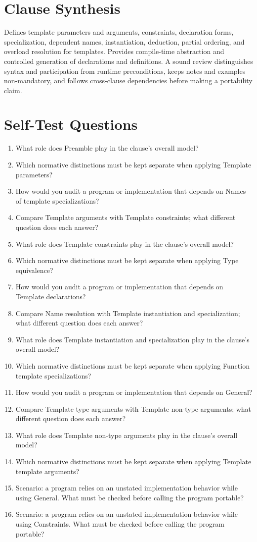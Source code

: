 \documentclass[11pt,letterpaper]{article}
\begin{document}
\section{Clause Synthesis}
\begin{CornellReferenceOrientationBox}Defines template parameters and arguments, constraints, declaration forms, specialization, dependent names, instantiation, deduction, partial ordering, and overload resolution for templates. Provides compile-time abstraction and controlled generation of declarations and definitions. A sound review distinguishes syntax and participation from runtime preconditions, keeps notes and examples non-mandatory, and follows cross-clause dependencies before making a portability claim.\end{CornellReferenceOrientationBox}
\section{Self-Test Questions}
\begin{enumerate}
\item What role does Preamble play in the clause's overall model?
\item Which normative distinctions must be kept separate when applying Template parameters?
\item How would you audit a program or implementation that depends on Names of template specializations?
\item Compare Template arguments with Template constraints; what different question does each answer?
\item What role does Template constraints play in the clause's overall model?
\item Which normative distinctions must be kept separate when applying Type equivalence?
\item How would you audit a program or implementation that depends on Template declarations?
\item Compare Name resolution with Template instantiation and specialization; what different question does each answer?
\item What role does Template instantiation and specialization play in the clause's overall model?
\item Which normative distinctions must be kept separate when applying Function template specializations?
\item How would you audit a program or implementation that depends on General?
\item Compare Template type arguments with Template non-type arguments; what different question does each answer?
\item What role does Template non-type arguments play in the clause's overall model?
\item Which normative distinctions must be kept separate when applying Template template arguments?
\item Scenario: a program relies on an unstated implementation behavior while using General. What must be checked before calling the program portable?
\item Scenario: a program relies on an unstated implementation behavior while using Constraints. What must be checked before calling the program portable?
\end{enumerate}
\end{document}
